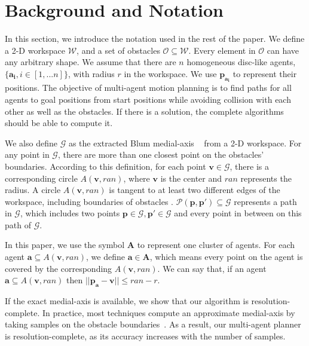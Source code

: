\section{Background and Notation}

In this section, we introduce the notation used in the rest of the paper. We define a 2-D workspace $\mathcal{W}$, and a set of obstacles $\mathcal{O} \subseteq \mathcal{W}$. Every element in $\mathcal{O}$ can have any arbitrary shape. We assume that there are $n$ homogeneous disc-like agents, $\{\mathbf{a_{i}}, i \in [1,...n]\}$, with radius $r$ in the workspace. We use $\mathbf{p_{a_i}}$ to represent their positions. %
The objective of multi-agent motion planning is to find paths for all agents to goal positions from start positions while avoiding collision with each other as well as the obstacles. If there is a solution, the complete algorithms should be able to compute it.

We also define $\mathcal G$ as the extracted Blum medial-axis ~\cite{blum1978shape} from a 2-D workspace. For any point in $\mathcal G$, there are more than one closest point on the obstacles' boundaries.
According to this definition, for each point $\mathbf v \in \mathcal G$, there is a corresponding circle $A(\mathbf v,ran)$, where $\mathbf v$ is the center and $ran$ represents the radius. A circle $A(\mathbf v,ran)$ is tangent to at least two different edges of the workspace, including boundaries of obstacles . $\mathcal P(\mathbf p, \mathbf p') \subseteq \mathcal G$ represents a path in $\mathcal G$, which includes two points $\mathbf p \in \mathcal G, \mathbf p' \in \mathcal G$ and every point in between on this path of $\mathcal G$.

In this paper, we use the symbol $\mathbf{A}$ to represent one cluster of agents. For each agent $\mathbf{a} \subseteq A(\mathbf v,ran)$, we define $\mathbf{a} \in \mathbf{A}$, which means every point on the agent is covered by the corresponding $A(\mathbf v,ran)$. We can say that, if an agent $\mathbf{a} \subseteq A(\mathbf v,ran)$ then $||\mathbf{p_a} - \mathbf v|| \leq ran - r$.


If the exact medial-axis is available, we show that our algorithm is resolution-complete. In practice, most techniques compute an approximate medial-axis by taking samples on the obstacle boundaries~\cite{giesen2012medial}. As a result, our multi-agent planner is resolution-complete, as its accuracy increases with the number of samples. 

